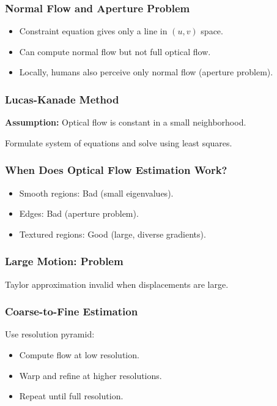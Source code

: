 \begin{frame}
  \frametitle{Normal Flow and Aperture Problem}
\begin{itemize}
  \item Constraint equation gives only a line in $(u,v)$ space.
  \item Can compute normal flow but not full optical flow.
  \item Locally, humans also perceive only normal flow (aperture problem).
\end{itemize}

\vspace{0.5cm}
\centering
\end{frame}

\begin{frame}
  \frametitle{Lucas-Kanade Method}
\textbf{Assumption:} Optical flow is constant in a small neighborhood.

Formulate system of equations and solve using least squares.

\vspace{0.5cm}
\centering
\end{frame}

\begin{frame}
  \frametitle{When Does Optical Flow Estimation Work?}
\begin{itemize}
  \item Smooth regions: Bad (small eigenvalues).
  \item Edges: Bad (aperture problem).
  \item Textured regions: Good (large, diverse gradients).
\end{itemize}

\vspace{0.5cm}
\centering
\end{frame}

\begin{frame}
  \frametitle{Large Motion: Problem}
Taylor approximation invalid when displacements are large.

\vspace{0.5cm}
\centering
\end{frame}

\begin{frame}
  \frametitle{Coarse-to-Fine Estimation}
Use resolution pyramid:
\begin{itemize}
  \item Compute flow at low resolution.
  \item Warp and refine at higher resolutions.
  \item Repeat until full resolution.
\end{itemize}

\vspace{0.5cm}
\centering
\end{frame}

